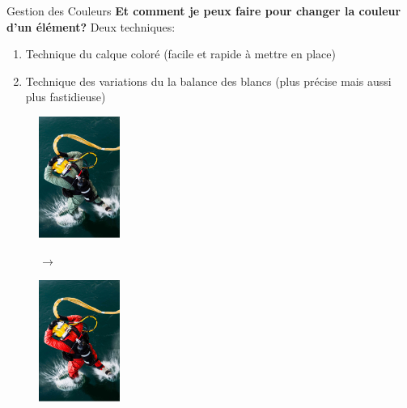 \documentclass[10pt,svgnames,usenames,table]{beamer}
\begin{document}
	\begin{frame}{Gestion des Couleurs}
	\textbf{Et comment je peux faire pour changer la couleur d'un élément?}
	Deux techniques:
	\begin{enumerate}
		\item Technique du calque coloré (facile et rapide à mettre en place)	
		\item Technique des variations du la balance des blancs (plus précise mais aussi plus fastidieuse)
	\end{enumerate}
		\begin{figure}[H]
			\centering
			\begin{minipage}{.5\textwidth}
				\centering
				\includegraphics[height=150px]{Images/colours/col5} 
				\end{minipage}$\rightarrow$%
			\begin{minipage}{.5\textwidth}
				\centering
				\includegraphics[height=150px]{Images/colours/col6} 
				\end{minipage}
			\end{figure}			
	\end{frame}		
\end{document}
